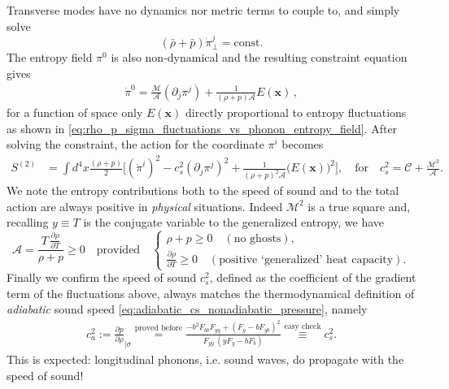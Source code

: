 Transverse modes have no dynamics nor metric terms to couple to, and simply solve
\begin{equation}
    (\bar{\rho}+\bar{p})\dot{\pi}_\perp^j=\text{const}.
\end{equation}
The entropy field $\pi^0$ is also non-dynamical and the resulting constraint equation gives
\begin{align}\label{eq:integrate_out_entropy_flat_spacetime}
    \dot{\pi}^0 = \frac{\mathcal{M}}{\mathcal{A}} (\partial_j \pi^j) +  \frac{1}{(\rho+p)\mathcal{A}}{E(\mathbf{x})}\,,
\end{align}
for a function of space only $E(\mathbf{x})$ directly proportional to entropy fluctuations as shown in \eqref{eq:rho_p_sigma_fluctuations_vs_phonon_entropy_field}.
After solving the constraint, the action for the coordinate $\pi^i$ becomes
{\small
\begin{align}
    S^{(2)}&= \int d^4x \frac{(\rho+p)}{2}\Big[(\dot{\pi}^i)^2 - c_s^2 (\partial_j\pi^j)^2 +\tfrac{1}{(\rho+p)^2\mathcal{A}}\big(E(\mathbf{x})\big)^2\Big], \quad \text{for}\quad c_s^2 = \mathcal{C} + \frac{\mathcal{M}^2}{\mathcal{A}}.
\end{align}
}
We note the entropy contributions both to the speed of sound and to the total action are always positive in \emph{physical} situations.
Indeed $\mathcal{M}^2$ is a true square and, recalling $y\equiv T$ is the conjugate variable to the generalized entropy, we have
\begin{equation}
    \mathcal{A}= \frac{T\, \frac{\partial\rho }{\partial T}}{\rho+p}\geq 0 \quad\text{provided}\quad
    \begin{cases}
        \rho+p\geq 0 \quad(\text{no ghosts}),\\
        \frac{\partial\rho }{\partial T} \geq 0 \quad(\text{positive `generalized' heat capacity}).
    \end{cases} 
\end{equation}
Finally we confirm the speed of sound $c_s^2$, defined as the coefficient of the gradient term of the fluctuations above, always matches the thermodynamical definition of \emph{adiabatic} sound speed \eqref{eq:adiabatic_cs_nonadiabatic_pressure}, namely
\begin{align}\label{eq:cs_equiv_ca_flat_spacetime}
    c_a^2:= \frac{\partial p}{\partial \rho}_{\mid \sigma} \overset{\text{proved before}}{=}\frac{-b^2F_{bb} F_{yy}+(F_y-bF_{yb})^2}{F_{yy}\,(yF_y-bF_b)} \overset{\text{easy check}}{\equiv} c_s^2.
\end{align}
This is expected: longitudinal phonons, i.e. sound waves, do propagate with the speed of sound!





